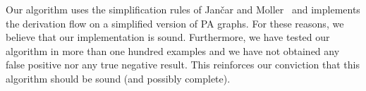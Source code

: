 Our algorithm uses the simplification rules of  Jan{\v{c}}ar and
Moller~\cite{janvcar1999techniques} and implements the derivation flow on
a simplified version of PA graphs. For these reasons, we
believe that our implementation is sound. Furthermore, we have tested
our algorithm in more than one hundred examples and we have not
obtained any false positive nor any true negative result. This
reinforces our conviction that this algorithm should be sound (and
possibly complete).

